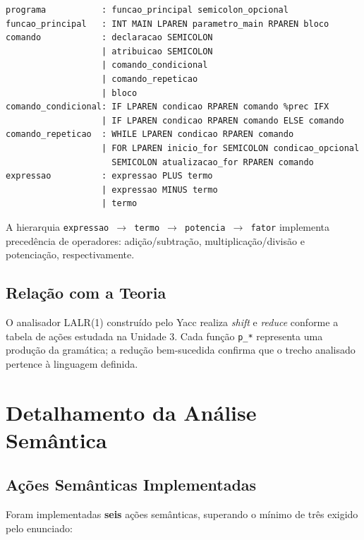 \documentclass[12pt,a4paper]{article}
\begin{document}
\begin{lstlisting}[style=gramatica]
programa           : funcao_principal semicolon_opcional
funcao_principal   : INT MAIN LPAREN parametro_main RPAREN bloco
comando            : declaracao SEMICOLON
                   | atribuicao SEMICOLON
                   | comando_condicional
                   | comando_repeticao
                   | bloco
comando_condicional: IF LPAREN condicao RPAREN comando %prec IFX
                   | IF LPAREN condicao RPAREN comando ELSE comando
comando_repeticao  : WHILE LPAREN condicao RPAREN comando
                   | FOR LPAREN inicio_for SEMICOLON condicao_opcional
                     SEMICOLON atualizacao_for RPAREN comando
expressao          : expressao PLUS termo
                   | expressao MINUS termo
                   | termo
\end{lstlisting}

A hierarquia \texttt{expressao $\rightarrow$ termo $\rightarrow$ potencia $\rightarrow$ fator}
implementa precedência de operadores: adição/subtração, multiplicação/divisão e
potenciação, respectivamente.

\subsection{Relação com a Teoria}

O analisador LALR(1) construído pelo Yacc realiza \textit{shift} e \textit{reduce}
conforme a tabela de ações estudada na Unidade 3. Cada função \texttt{p\_*} representa
uma produção da gramática; a redução bem-sucedida confirma que o trecho analisado
pertence à linguagem definida.

\section{Detalhamento da Análise Semântica}

\subsection{Ações Semânticas Implementadas}

Foram implementadas \textbf{seis} ações semânticas, superando o mínimo de três
exigido pelo enunciado:
\end{document}
